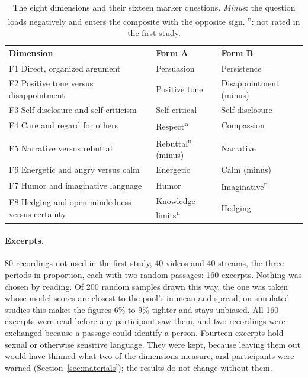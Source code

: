 \begin{table}[!htb]\centering
\caption{The eight dimensions and their sixteen marker questions. \emph{Minus}: the question loads negatively
and enters the composite with the opposite sign. \textsuperscript{n}: not rated in the first
study.}\label{tab:s2markers}
\small
\begin{tabular}{@{}lll@{}}
\toprule
Dimension & Form A & Form B \\
\midrule
F1 Direct, organized argument & Persuasion & Persistence \\
F2 Positive tone versus disappointment & Positive tone & Disappointment (minus) \\
F3 Self-disclosure and self-criticism & Self-critical & Self-disclosure \\
F4 Care and regard for others & Respect\textsuperscript{n} & Compassion \\
F5 Narrative versus rebuttal & Rebuttal\textsuperscript{n} (minus) & Narrative \\
F6 Energetic and angry versus calm & Energetic & Calm (minus) \\
F7 Humor and imaginative language & Humor & Imaginative\textsuperscript{n} \\
F8 Hedging and open-mindedness versus certainty & Knowledge limits\textsuperscript{n} & Hedging \\
\bottomrule
\end{tabular}
\end{table}

\paragraph{Excerpts.} 80 recordings not used in the first study, 40 videos and 40 streams, the three periods in
proportion, each with two random passages: 160 excerpts. Nothing was chosen by reading. Of 200 random samples
drawn this way, the one was taken whose model scores are closest to the pool's in mean and spread; on simulated
studies this makes the figures 6\% to 9\% tighter and stays unbiased. All 160 excerpts were read before any
participant saw them, and two recordings were exchanged because a passage could identify a person. Fourteen
excerpts hold sexual or otherwise sensitive language. They were kept, because leaving them out would have
thinned what two of the dimensions measure, and participants were warned (Section~\ref{sec:materials}); the
results do not change without them.

